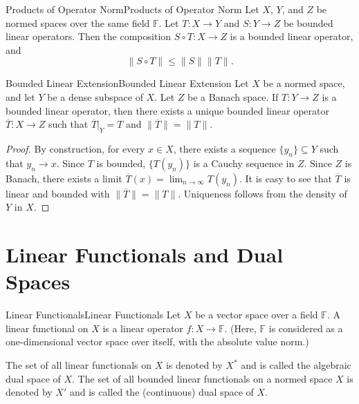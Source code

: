\documentclass[../main.tex]{subfiles}
\begin{document}
\begin{proposition}{Products of Operator Norm}{Products of Operator Norm}
	Let $X$, $Y$, and $Z$ be normed spaces over the same field $\mathbb{F}$. Let $T: X \rightarrow Y$ and $S: Y \rightarrow Z$ be bounded linear operators. Then the composition $S \circ T: X \rightarrow Z$ is a bounded linear operator, and
	\begin{equation*}
		\|S \circ T\| \leq \|S\| \|T\|.
	\end{equation*}
\end{proposition}

\begin{theorem}{Bounded Linear Extension}{Bounded Linear Extension}
	Let $X$ be a normed space, and let $Y$ be a dense subspace of $X$. Let $Z$ be a Banach space. If $T: Y \rightarrow Z$ is a bounded linear operator, then there exists a unique bounded linear operator $\overline{T}: X \rightarrow Z$ such that $\overline{T}|_Y = T$ and $\|\overline{T}\| = \|T\|$.
\end{theorem}
\begin{proof}
	By construction, for every $x\in X$, there exists a sequence $\{y_n\}\subseteq Y$ such that $y_n\rightarrow x$. Since $T$ is bounded, $\{T(y_n)\}$ is a Cauchy sequence in $Z$. Since $Z$ is Banach, there exists a limit $\overline{T}(x) = \lim_{n\rightarrow \infty} T(y_n)$. It is easy to see that $\overline{T}$ is linear and bounded with $\|\overline{T}\| = \|T\|$. Uniqueness follows from the density of $Y$ in $X$.
\end{proof}

\section{Linear Functionals and Dual Spaces}

\begin{definition}{Linear Functionals}{Linear Functionals}
	Let $X$ be a vector space over a field $\mathbb{F}$. A linear functional on $X$ is a linear operator $f: X \rightarrow \mathbb{F}$. (Here, $\mathbb{F}$ is considered as a one-dimensional vector space over itself, with the absolute value norm.)

	The set of all linear functionals on $X$ is denoted by $X^*$ and is called the algebraic dual space of $X$. The set of all bounded linear functionals on a normed space $X$ is denoted by $X'$ and is called the (continuous) dual space of $X$.
\end{definition}
\end{document}
